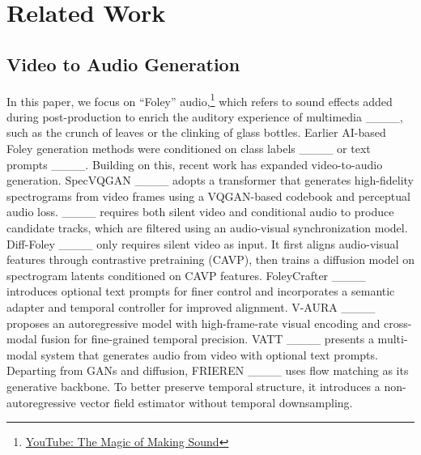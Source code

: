 \section{Related Work}
\label{sec:relatedworks}

\subsection{Video to Audio Generation}
In this paper, we focus on ``Foley'' audio,\footnote{\href{https://www.youtube.com/watch?v=UO3N_PRIgX0}{YouTube: The Magic of Making Sound}} which refers to sound effects added during post-production to enrich the auditory experience of multimedia ____, such as the crunch of leaves or the clinking of glass bottles. Earlier AI-based Foley generation methods were conditioned on class labels ____ or text prompts ____. Building on this, recent work has expanded video-to-audio generation. SpecVQGAN ____ adopts a transformer that generates high-fidelity spectrograms from video frames using a VQGAN-based codebook and perceptual audio loss. ____ requires both silent video and conditional audio to produce candidate tracks, which are filtered using an audio-visual synchronization model. Diff-Foley ____ only requires silent video as input. It first aligns audio-visual features through contrastive pretraining (CAVP), then trains a diffusion model on spectrogram latents conditioned on CAVP features. FoleyCrafter ____ introduces optional text prompts for finer control and incorporates a semantic adapter and temporal controller for improved alignment. V-AURA ____ proposes an autoregressive model with high-frame-rate visual encoding and cross-modal fusion for fine-grained temporal precision. VATT ____ presents a multi-modal system that generates audio from video with optional text prompts. Departing from GANs and diffusion, FRIEREN ____ uses flow matching as its generative backbone. To better preserve temporal structure, it introduces a non-autoregressive vector field estimator without temporal downsampling.



